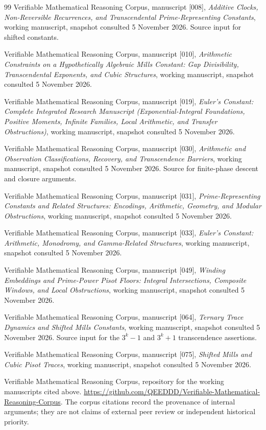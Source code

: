\documentclass[11pt,a4paper]{article}
\numberwithin{equation}{section}
\theoremstyle{definition}
\theoremstyle{remark}
\begin{document}
\begin{thebibliography}{99}
Verifiable Mathematical Reasoning Corpus, manuscript [008],
\emph{Additive Clocks, Non-Reversible Recurrences, and Transcendental
Prime-Representing Constants}, working manuscript, snapshot consulted
5 November 2026.  Source input for shifted constants.

Verifiable Mathematical Reasoning Corpus, manuscript [010],
\emph{Arithmetic Constraints on a Hypothetically Algebraic Mills Constant:
Gap Divisibility, Transcendental Exponents, and Cubic Structures}, working
manuscript, snapshot consulted 5 November 2026.

Verifiable Mathematical Reasoning Corpus, manuscript [019],
\emph{Euler's Constant: Complete Integrated Research Manuscript
(Exponential-Integral Foundations, Positive Moments, Infinite Families,
Local Arithmetic, and Transfer Obstructions)}, working manuscript,
snapshot consulted 5 November 2026.

Verifiable Mathematical Reasoning Corpus, manuscript [030],
\emph{Arithmetic and Observation Classifications, Recovery, and
Transcendence Barriers}, working manuscript, snapshot consulted
5 November 2026.  Source for finite-phase descent and closure arguments.

Verifiable Mathematical Reasoning Corpus, manuscript [031],
\emph{Prime-Representing Constants and Related Structures: Encodings,
Arithmetic, Geometry, and Modular Obstructions}, working manuscript,
snapshot consulted 5 November 2026.

Verifiable Mathematical Reasoning Corpus, manuscript [033],
\emph{Euler's Constant: Arithmetic, Monodromy, and Gamma-Related
Structures}, working manuscript, snapshot consulted 5 November 2026.

Verifiable Mathematical Reasoning Corpus, manuscript [049],
\emph{Winding Embeddings and Prime-Power Pisot Floors: Integral
Intersections, Composite Windows, and Local Obstructions}, working
manuscript, snapshot consulted 5 November 2026.

Verifiable Mathematical Reasoning Corpus, manuscript [064],
\emph{Ternary Trace Dynamics and Shifted Mills Constants}, working
manuscript, snapshot consulted 5 November 2026.  Source input for the
$3^k-1$ and $3^k+1$ transcendence assertions.

Verifiable Mathematical Reasoning Corpus, manuscript [075],
\emph{Shifted Mills and Cubic Pisot Traces}, working manuscript,
snapshot consulted 5 November 2026.

Verifiable Mathematical Reasoning Corpus, repository for the working
manuscripts cited above.
\url{https://github.com/QEEDDD/Verifiable-Mathematical-Reasoning-Corpus}.
The corpus citations record the provenance of internal arguments; they
are not claims of external peer review or independent historical priority.

\end{thebibliography}
\end{document}
